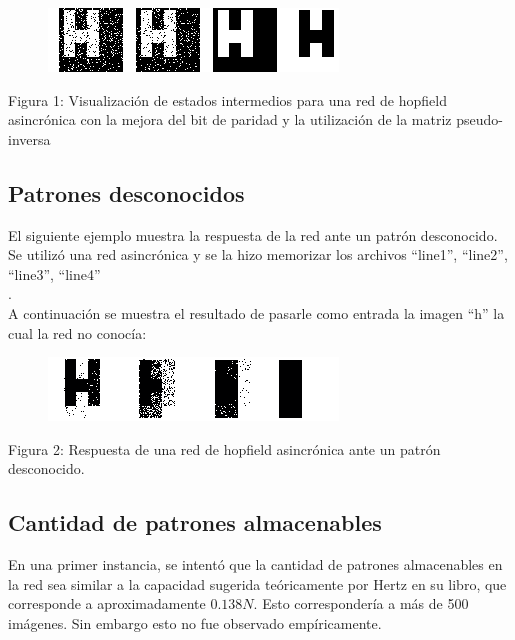 \documentclass[%
    final,
    reprint,
    notitlepage,
    narroweqnarray,
    inline,
    twoside,
    invited
    ]{ieee}
\begin{document}
\begin{figure}[H]
\begin{center}
\includegraphics[scale=0.60]{./images/hinvypar.png}
\label{modelado}
\end{center}
\end{figure}

\begin{center}
\par Figura 1: Visualización de estados intermedios para una red de hopfield asincrónica con la mejora del bit de paridad y la utilización de la matriz pseudo-inversa
\end{center}

\subsection{Patrones desconocidos}

\par El siguiente ejemplo muestra la respuesta de la red ante un patrón desconocido. Se utilizó una red asincrónica y se la hizo memorizar los archivos ``line1'', ``line2'', ``line3'', ``line4''\\.\\
A continuación se muestra el resultado de pasarle como entrada la imagen ``h''  la cual la red no conocía: \\

\begin{figure}[H]
\begin{center}
\includegraphics[scale=0.60]{./images/hnoinvnopar.png}
\label{modelado}
\end{center}
\end{figure}

\begin{center}
\par Figura 2: Respuesta de una red de hopfield asincrónica ante un patrón desconocido.
\end{center}


\subsection{Cantidad de patrones almacenables}
\par En una primer instancia, se intentó que la cantidad de patrones almacenables en la red 
sea similar a la capacidad sugerida teóricamente por Hertz en su libro, que corresponde a aproximadamente $0.138N$. Esto correspondería a más de 500 imágenes. Sin embargo esto no fue observado empíricamente.\\
\end{document}
